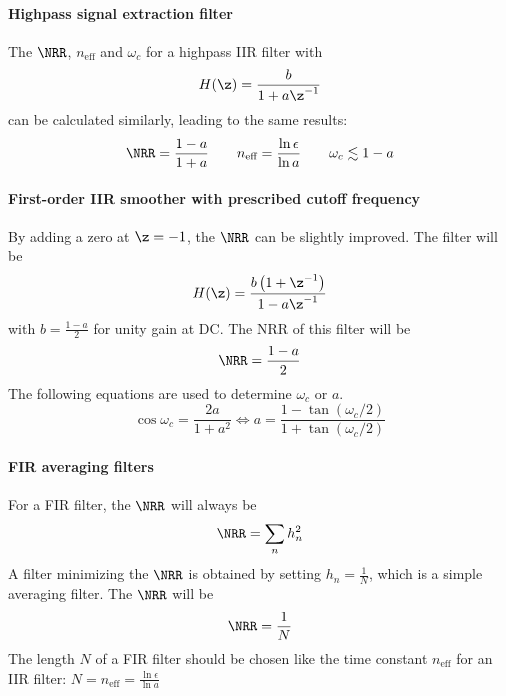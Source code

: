 \paragraph{Highpass signal extraction filter}
The $\NRR$, $n_{\text{eff}}$ and $\omega_c$ for a highpass IIR filter with
\begin{equation*}
	H(\z) = \frac{b}{1+a\z^{-1}}
\end{equation*}
can be calculated similarly, leading to the same results:
\begin{equation*}
	\NRR = \frac{1-a}{1+a} \qquad n_{\text{eff}} = \frac{\ln \epsilon}{\ln a} \qquad \omega_c \lesssim 1-a
\end{equation*}

\paragraph{First-order IIR smoother with prescribed cutoff frequency}
By adding a zero at $\z=-1$, the $\NRR$ can be slightly improved.
The filter will be
\begin{equation*}
	H(\z) = \frac{b \left( 1 + \z^{-1} \right)}{1 - a \z^{-1}}
\end{equation*}
with $b = \frac{1-a}{2}$ for unity gain at DC. The NRR of this filter will be
\begin{equation*}
	\NRR = \frac{1-a}{2}
\end{equation*}
The following equations are used to determine $\omega_c$ or $a$.
\begin{equation*}
	\cos \omega_c = \frac{2 a}{1+a^2} \Leftrightarrow a = \frac{1-\tan(\omega_c/2)}{1+\tan(\omega_c/2)}
\end{equation*}

\paragraph{FIR averaging filters}
For a FIR filter, the $\NRR$ will always be
\begin{equation*}
	\NRR = \sum\limits_n h_n^2
\end{equation*}
A filter minimizing the $\NRR$ is obtained by setting $h_n = \frac{1}{N}$, which is a simple averaging filter. The $\NRR$ will be
\begin{equation*}
	\NRR = \frac{1}{N}
\end{equation*}
The length $N$ of a FIR filter should be chosen like the time constant
$n_{\text{eff}}$ for an IIR filter:
$N = n_{\text{eff}} = \frac{\ln \epsilon}{\ln a}$ \\

